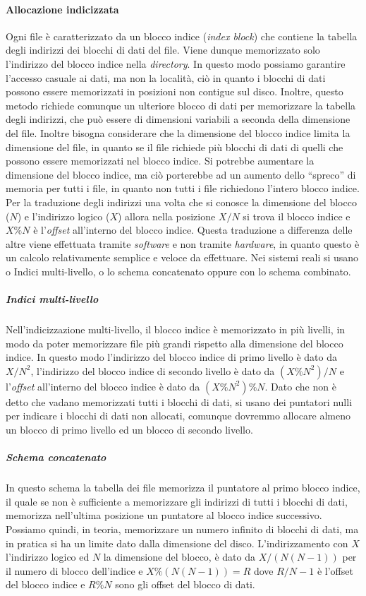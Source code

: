         \paragraph{Allocazione indicizzata} Ogni file è caratterizzato da un blocco indice (\textit{index block}) che contiene la tabella degli indirizzi dei blocchi di dati del file. Viene dunque memorizzato solo l'indirizzo del blocco indice nella \textit{directory}. In questo modo possiamo garantire l'accesso casuale ai dati, ma non la località, ciò in quanto i blocchi di dati possono essere memorizzati in posizioni non contigue sul disco. Inoltre, questo metodo richiede comunque un ulteriore blocco di dati per memorizzare la tabella degli indirizzi, che può essere di dimensioni variabili a seconda della dimensione del file. Inoltre bisogna considerare che la dimensione del blocco indice limita la dimensione del file, in quanto se il file richiede più blocchi di dati di quelli che possono essere memorizzati nel blocco indice. Si potrebbe aumentare la dimensione del blocco indice, ma ciò porterebbe ad un aumento dello ``spreco'' di memoria per tutti i file, in quanto non tutti i file richiedono l'intero blocco indice. Per la traduzione degli indirizzi una volta che si conosce la dimensione del blocco ($N$) e l'indirizzo logico ($X$) allora nella posizione $X/N$ si trova il blocco indice e $X\%N$ è l'\textit{offset} all'interno del blocco indice. Questa traduzione a differenza delle altre viene effettuata tramite \textit{software} e non tramite \textit{hardware}, in quanto questo è un calcolo relativamente semplice e veloce da effettuare.\newline  
        Nei sistemi reali si usano o Indici multi-livello, o lo schema concatenato oppure con lo schema combinato. 
            \subparagraph{Indici multi-livello}  Nell'indicizzazione multi-livello, il blocco indice è memorizzato in più livelli, in modo da poter memorizzare file più grandi rispetto alla dimensione del blocco indice. In questo modo l'indirizzo del blocco indice di primo livello è dato da $X/N^2$, l'indirizzo del blocco indice di secondo livello è dato da $(X\%N^2)/N$ e l'\textit{offset} all'interno del blocco indice è dato da $(X\%N^2)\%N$. Dato che non è detto che vadano memorizzati tutti i blocchi di dati, si usano dei puntatori nulli per indicare i blocchi di dati non allocati, comunque dovremmo allocare almeno un blocco di primo livello ed un blocco di secondo livello.  
            \subparagraph{Schema concatenato} In questo schema la tabella dei file memorizza il puntatore al primo blocco indice, il quale se non è sufficiente a memorizzare gli indirizzi di tutti i blocchi di dati, memorizza nell'ultima posizione un puntatore al blocco indice successivo. Possiamo quindi, in teoria, memorizzare un numero infinito di blocchi di dati, ma in pratica si ha un limite dato dalla dimensione del disco. L'indirizzamento con $X$ l'indirizzo logico ed $N$ la dimensione del blocco, è dato da $X/(N(N-1))$ per il numero di blocco dell'indice e $X\%(N(N-1)) = R$ dove $R/N-1$ è l'offset del blocco indice e $R\%N$ sono gli offset del blocco di dati.
